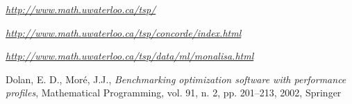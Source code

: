 \begin{thebibliography}{1}

\begin{comment}
\bibitem{alg} Pierluigi Crescenzi, Pierre Fraigniaud, Magnus Halldórsson, Hovhannes A. Harutyunyand, Chiara Pierucci, Andrea Pietracaprina, Geppino Pucci \emph {On the complexity of the shortest-path broadcast problem, Discrete Applied Mathematics , vol. 199, pp. 101-109, 2016.}
\end{comment}

 \emph{\url{http://www.math.uwaterloo.ca/tsp/}}

 \emph{\url{http://www.math.uwaterloo.ca/tsp/concorde/index.html}}

 \emph{\url{http://www.math.uwaterloo.ca/tsp/data/ml/monalisa.html}}

 Dolan, E. D., Mor{\'e}, J.J., \emph{Benchmarking optimization software with performance profiles}, Mathematical Programming, vol. 91, n. 2, pp. 201--213, 2002, Springer


\end{thebibliography}